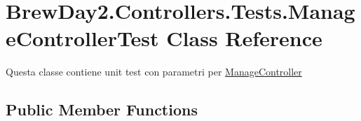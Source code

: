 \hypertarget{class_brew_day2_1_1_controllers_1_1_tests_1_1_manage_controller_test}{}\section{Brew\+Day2.\+Controllers.\+Tests.\+Manage\+Controller\+Test Class Reference}
\label{class_brew_day2_1_1_controllers_1_1_tests_1_1_manage_controller_test}


Questa classe contiene unit test con parametri per \mbox{\hyperlink{class_brew_day2_1_1_controllers_1_1_manage_controller}{Manage\+Controller}} 


\subsection*{Public Member Functions}
